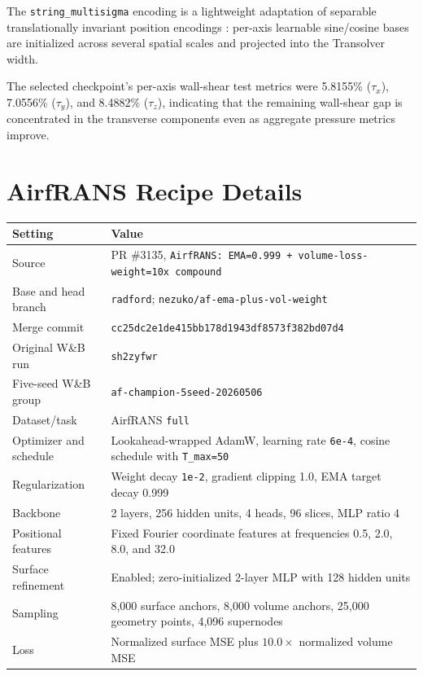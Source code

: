 \documentclass{article}
\begin{document}
The \texttt{string\_multisigma} encoding is a lightweight adaptation of separable translationally invariant position encodings \citep{schenck2025learningropes}: per-axis learnable sine/cosine bases are initialized across several spatial scales and projected into the Transolver width.

The selected checkpoint's per-axis wall-shear test metrics were 5.8155\% ($\tau_x$), 7.0556\% ($\tau_y$), and 8.4882\% ($\tau_z$), indicating that the remaining wall-shear gap is concentrated in the transverse components even as aggregate pressure metrics improve.

\section{AirfRANS Recipe Details}
\label{app:airfrans-recipe}

\begin{center}
  \label{tab:app-airfrans-config}
  \small
  \begin{tabular}{@{}ll@{}}
    \toprule
    Setting & Value \\
    \midrule
    Source & PR \#3135, \texttt{AirfRANS: EMA=0.999 + volume-loss-weight=10x compound} \\
    Base and head branch & \texttt{radford}; \texttt{nezuko/af-ema-plus-vol-weight} \\
    Merge commit & \texttt{cc25dc2e1de415bb178d1943df8573f382bd07d4} \\
    Original W\&B run & \texttt{sh2zyfwr} \\
    Five-seed W\&B group & \texttt{af-champion-5seed-20260506} \\
    Dataset/task & AirfRANS \texttt{full} \\
    Optimizer and schedule & Lookahead-wrapped AdamW, learning rate \texttt{6e-4}, cosine schedule with \texttt{T\_max=50} \\
    Regularization & Weight decay \texttt{1e-2}, gradient clipping 1.0, EMA target decay 0.999 \\
    Backbone & 2 layers, 256 hidden units, 4 heads, 96 slices, MLP ratio 4 \\
    Positional features & Fixed Fourier coordinate features at frequencies 0.5, 2.0, 8.0, and 32.0 \\
    Surface refinement & Enabled; zero-initialized 2-layer MLP with 128 hidden units \\
    Sampling & 8,000 surface anchors, 8,000 volume anchors, 25,000 geometry points, 4,096 supernodes \\
    Loss & Normalized surface MSE plus $10.0 \times$ normalized volume MSE \\
    \bottomrule
  \end{tabular}
\end{center}
\end{document}
